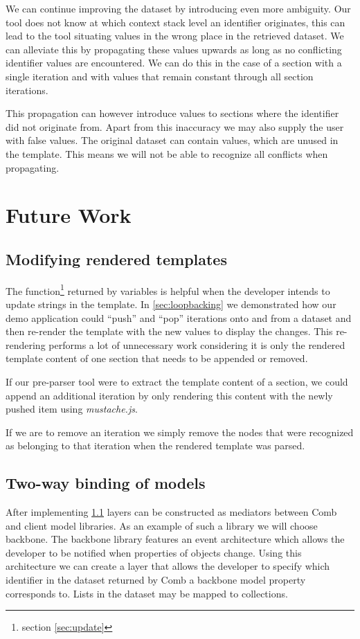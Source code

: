 \documentclass[thesis.tex]{subfiles}
\begin{document}
We can continue improving the dataset by introducing even more ambiguity.
Our tool does not know at which context stack level an identifier originates,
this can lead to the tool situating values in the wrong place in the retrieved
dataset. We can alleviate this by propagating these values upwards as long as no
conflicting identifier values are encountered. We can do this in the case of a
section with a single iteration and with values that remain constant through all
section iterations.

This propagation can however introduce values to sections where the identifier
did not originate from. Apart from this inaccuracy we may also supply the user
with false values. The original dataset can contain values, which are unused in
the template. This means we will not be able to recognize all conflicts when
propagating.

\section{Future Work}

\subsection{Modifying rendered templates}
\label{sec:update-dom}
The  function\footnote{section \ref{sec:update}} returned by
variables is helpful when the developer intends to update strings in the
template. In \ref{sec:loopbacking} we demonstrated how our demo application
could ``push'' and ``pop'' iterations onto and from a dataset and then re-render
the template with the new values to display the changes.
This re-rendering performs a lot of unnecessary work considering it is only
the rendered template content of one section that needs to be appended or
removed.

If our pre-parser tool were to extract the template content of a section, we
could append an additional iteration by only rendering this content with the
newly pushed item using \emph{mustache.js}.

If we are to remove an iteration we simply remove the nodes that were recognized
as belonging to that iteration when the rendered template was parsed.

\subsection{Two-way binding of models}
\label{sec:two-way-binding}
After implementing \ref{sec:update-dom} layers can be constructed as
mediators between Comb and client model libraries. As an example of such a
library we will choose backbone. The backbone library features an event
architecture which allows the developer to be notified when properties of
objects change. Using this architecture we can create a layer that allows the
developer to specify which identifier in the dataset returned by Comb a
backbone model property corresponds to. Lists in the dataset may be mapped to
collections.
\end{document}
